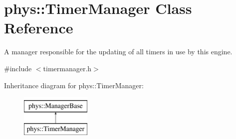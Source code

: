 \hypertarget{classphys_1_1TimerManager}{
\section{phys::TimerManager Class Reference}
\label{dc/d66/classphys_1_1TimerManager}
}


A manager responsible for the updating of all timers in use by this engine.  




{\ttfamily \#include $<$timermanager.h$>$}

Inheritance diagram for phys::TimerManager:\begin{figure}[H]
\begin{center}
\leavevmode
\includegraphics[height=2.000000cm]{dc/d66/classphys_1_1TimerManager}
\end{center}
\end{figure}
